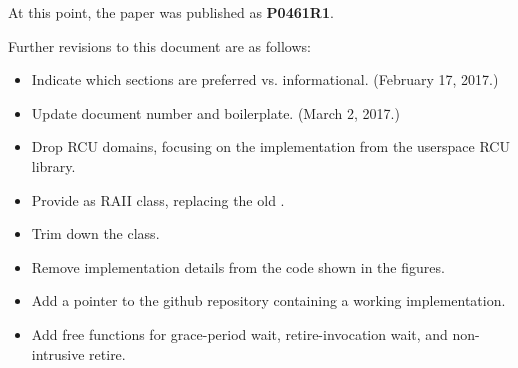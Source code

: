 \documentclass[letterpaper,10pt]{article}
\begin{document}
At this point, the paper was published as {\bf P0461R1}.

Further revisions to this document are as follows:

\begin{itemize}
\item	Indicate which sections are preferred vs. informational.
	(February 17, 2017.)
\item	Update document number and boilerplate.
	(March 2, 2017.)
\item	Drop RCU domains, focusing on the 
	implementation from the userspace RCU library.
\item	Provide  as RAII class, replacing the old
	.
\item	Trim down the  class.
\item	Remove implementation details from the code shown in
	the figures.
\item	Add a pointer to the github repository containing a
	working implementation.
\item	Add free functions for grace-period wait, retire-invocation
	wait, and non-intrusive retire.
\end{itemize}
\end{document}
